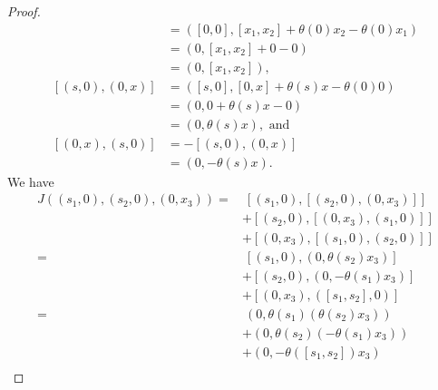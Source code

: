 \documentclass[12pt]{article}
\theoremstyle{definition}
\begin{document}
\begin{proof}
\begin{align*}
		[(0, x_1), (0, x_2)] & = ([0, 0], [x_1, x_2] + \theta(0)x_2 - \theta(0)x_1) \\
		                     & = (0, [x_1, x_2] + 0 - 0)                            \\
		                     & = (0, [x_1, x_2]),                                   \\
		[(s, 0), (0, x)]     & = ([s, 0], [0, x] + \theta(s)x - \theta(0)0)         \\
		                     & = (0, 0 + \theta(s)x - 0)                            \\
		                     & = (0, \theta(s)x), \text{ and}                       \\
		[(0, x), (s, 0)]     & = -[(s, 0), (0, x)]                                  \\
		                     & = (0, -\theta(s)x).
	\end{align*}
	We have \begin{align*}
		J((s_1, 0), (s_2, 0), (0, x_3)) = & \ [(s_1, 0), [(s_2, 0), (0, x_3)]]                                                                                   \\
		                                  & + [(s_2, 0), [(0, x_3), (s_1, 0)]]                                                                                   \\
		                                  & + [(0, x_3), [(s_1, 0), (s_2, 0)]]                                                                                   \\
		=                                 & \ [(s_1, 0), (0, \theta(s_2)x_3)]                                                                                    \\
		                                  & + [(s_2, 0), (0, -\theta(s_1)x_3)]                                                                                   \\
		                                  & + [(0, x_3), ([s_1, s_2], 0)]                                                                                        \\
		=                                 & \ (0, \theta(s_1)(\theta(s_2)x_3))                                                                                   \\
		                                  & + (0, \theta(s_2)(-\theta(s_1)x_3))                                                                                  \\
		                                  & + (0, -\theta([s_1, s_2])x_3)                                                                                        \\

\end{align*}
\end{proof}
\end{document}
